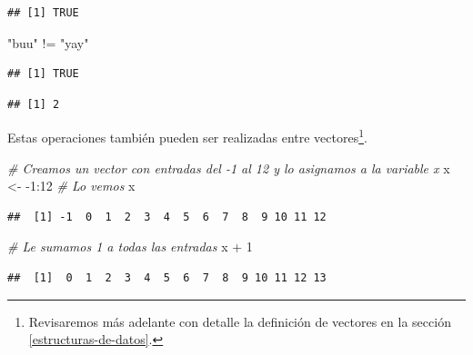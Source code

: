 \documentclass[]{article}
\newenvironment{Shaded}{\begin{snugshade}}{\end{snugshade}}
\newcommand{\DecValTok}[1]{\textcolor[rgb]{0.00,0.00,0.81}{{#1}}}
\newcommand{\StringTok}[1]{\textcolor[rgb]{0.31,0.60,0.02}{{#1}}}
\newcommand{\CommentTok}[1]{\textcolor[rgb]{0.56,0.35,0.01}{\textit{{#1}}}}
\newcommand{\NormalTok}[1]{{#1}}
\let\rmarkdownfootnote\footnote%
\def\footnote{\protect\rmarkdownfootnote}
\begin{document}
\begin{verbatim}
## [1] TRUE
\end{verbatim}

\begin{Shaded}
\begin{Highlighting}[]
\StringTok{"buu"} \NormalTok{!=}\StringTok{ "yay"}
\end{Highlighting}
\end{Shaded}

\begin{verbatim}
## [1] TRUE
\end{verbatim}

\begin{Shaded}
\end{Shaded}

\begin{verbatim}
## [1] 2
\end{verbatim}

Estas operaciones también pueden ser realizadas entre vectores\footnote{Revisaremos
  más adelante con detalle la definición de vectores en la sección
  \ref{estructuras-de-datos}.}.

\begin{Shaded}
\begin{Highlighting}[]
\CommentTok{# Creamos un vector con entradas del -1 al 12 y lo asignamos a la variable x}
\NormalTok{x <-}\StringTok{ }\NormalTok{-}\DecValTok{1}\NormalTok{:}\DecValTok{12}
\CommentTok{# Lo vemos}
\NormalTok{x}
\end{Highlighting}
\end{Shaded}

\begin{verbatim}
##  [1] -1  0  1  2  3  4  5  6  7  8  9 10 11 12
\end{verbatim}

\begin{Shaded}
\begin{Highlighting}[]
\CommentTok{# Le sumamos 1 a todas las entradas}
\NormalTok{x +}\StringTok{ }\DecValTok{1}
\end{Highlighting}
\end{Shaded}

\begin{verbatim}
##  [1]  0  1  2  3  4  5  6  7  8  9 10 11 12 13
\end{verbatim}
\end{document}

